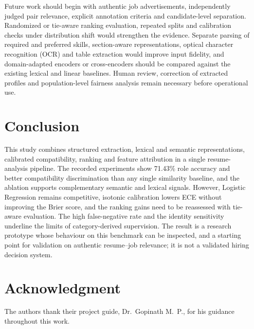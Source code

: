 \documentclass[conference]{IEEEtran}
\begin{document}
Future work should begin with authentic job advertisements, independently judged pair relevance, explicit annotation criteria and candidate-level separation. Randomized or tie-aware ranking evaluation, repeated splits and calibration checks under distribution shift would strengthen the evidence. Separate parsing of required and preferred skills, section-aware representations, optical character recognition (OCR) and table extraction would improve input fidelity, and domain-adapted encoders or cross-encoders should be compared against the existing lexical and linear baselines. Human review, correction of extracted profiles and population-level fairness analysis remain necessary before operational use.

\section{Conclusion}
This study combines structured extraction, lexical and semantic representations, calibrated compatibility, ranking and feature attribution in a single resume-analysis pipeline. The recorded experiments show 71.43\% role accuracy and better compatibility discrimination than any single similarity baseline, and the ablation supports complementary semantic and lexical signals. However, Logistic Regression remains competitive, isotonic calibration lowers ECE without improving the Brier score, and the ranking gains need to be reassessed with tie-aware evaluation. The high false-negative rate and the identity sensitivity underline the limits of category-derived supervision. The result is a research prototype whose behaviour on this benchmark can be inspected, and a starting point for validation on authentic resume--job relevance; it is not a validated hiring decision system.

\section*{Acknowledgment}
The authors thank their project guide, Dr.\ Gopinath M.\ P., for his guidance throughout this work.
\end{document}
